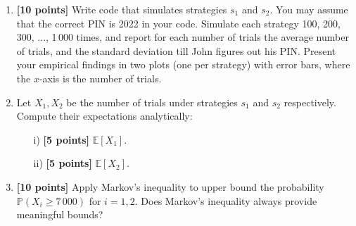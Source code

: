 \begin{tcolorbox}
\begin{enumerate}
    \item  {\bf [10 points] } Write code that simulates strategies $s_1$ and $s_2$. You may assume that the correct PIN is 2022 in your code. Simulate each strategy 100, 200, 300, ..., 1\,000 times, and report for each number of trials the average number of trials, and the standard deviation till John figures out his PIN. Present your empirical findings in two plots (one per strategy) with error bars, where the $x$-axis is the number of trials.  
    \item  Let $X_1,X_2$ be the number of trials under strategies $s_1$ and $s_2$ respectively. Compute their expectations analytically: 
    \begin{itemize}
        \item[i)]   {\bf [5 points] }$ \mathbb{E}[X_1]$.
        \item[ii)]  {\bf [5 points] } $ \mathbb{E}[X_2]$.
    \end{itemize} 


\item  {\bf [10 points] } Apply Markov's inequality to upper bound the probability $\mathbb{P}(X_i \geq 7\,000)$ for $i=1,2$.  Does Markov's inequality always provide meaningful bounds?
\end{enumerate}
\end{tcolorbox}



